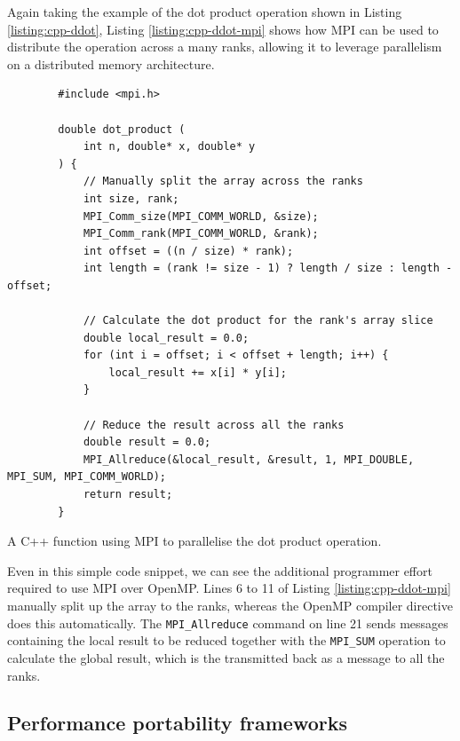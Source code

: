 Again taking the example of the dot product operation shown in Listing \ref{listing:cpp-ddot}, Listing \ref{listing:cpp-ddot-mpi} shows how MPI can be used to distribute the operation across a many ranks, allowing it to leverage parallelism on a distributed memory architecture.

\begin{code}
    \begin{verbatim}
        #include <mpi.h>
        
        double dot_product (
            int n, double* x, double* y
        ) {
            // Manually split the array across the ranks
            int size, rank;
            MPI_Comm_size(MPI_COMM_WORLD, &size);
            MPI_Comm_rank(MPI_COMM_WORLD, &rank);
            int offset = ((n / size) * rank);
            int length = (rank != size - 1) ? length / size : length - offset;
        
            // Calculate the dot product for the rank's array slice
            double local_result = 0.0;
            for (int i = offset; i < offset + length; i++) {
                local_result += x[i] * y[i];
            }
        
            // Reduce the result across all the ranks
            double result = 0.0;
            MPI_Allreduce(&local_result, &result, 1, MPI_DOUBLE, MPI_SUM, MPI_COMM_WORLD);
            return result;
        }
    \end{verbatim}
    \caption{A C++ function using MPI to parallelise the dot product operation.}
    \label{listing:cpp-ddot-mpi}
\end{code}

Even in this simple code snippet, we can see the additional programmer effort required to use MPI over OpenMP. Lines 6 to 11 of Listing \ref{listing:cpp-ddot-mpi} manually split up the array to the ranks, whereas the OpenMP compiler directive does this automatically. The \texttt{MPI_Allreduce} command on line 21 sends messages containing the local result to be reduced together with the \texttt{MPI_SUM} operation to calculate the global result, which is the transmitted back as a message to all the ranks.

\subsection{Performance portability frameworks}
\label{ssec:performance-portability-frameworks}

